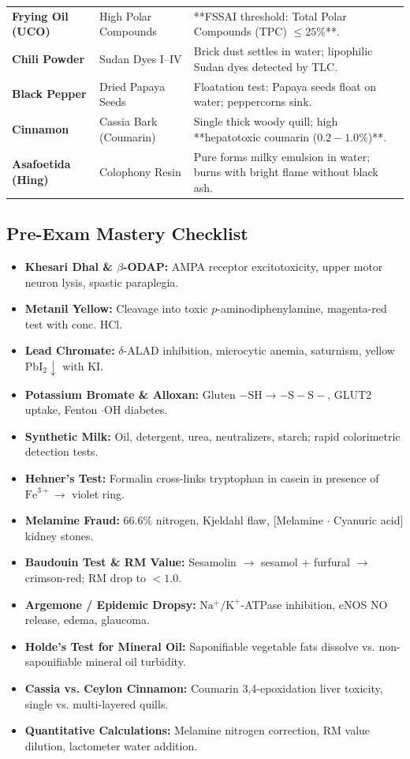 \documentclass[10pt,a4paper,oneside]{article}
\begin{document}
\begin{center}
\begin{tabular}{@{}p{3.2cm} p{3.8cm} p{10.0cm}@{}}
\textbf{Frying Oil (UCO)} & High Polar Compounds & **FSSAI threshold: Total Polar Compounds (TPC) $\le 25\%$**. \tabularnewline
\textbf{Chili Powder} & Sudan Dyes I--IV & Brick dust settles in water; lipophilic Sudan dyes detected by TLC. \tabularnewline
\textbf{Black Pepper} & Dried Papaya Seeds & Floatation test: Papaya seeds float on water; peppercorns sink. \tabularnewline
\textbf{Cinnamon} & Cassia Bark (Coumarin) & Single thick woody quill; high **hepatotoxic coumarin ($0.2-1.0\%$)**. \tabularnewline
\textbf{Asafoetida (Hing)} & Colophony Resin & Pure forms milky emulsion in water; burns with bright flame without black ash. \tabularnewline
\bottomrule
\end{tabular}
\end{center}

\subsection{Pre-Exam Mastery Checklist}
\begin{itemize}[leftmargin=*]
    \item[$\square$] \textbf{Khesari Dhal \& $\beta$-ODAP:} AMPA receptor excitotoxicity, upper motor neuron lysis, spastic paraplegia.
    \item[$\square$] \textbf{Metanil Yellow:} Cleavage into toxic $p$-aminodiphenylamine, magenta-red test with conc. $\mathrm{HCl}$.
    \item[$\square$] \textbf{Lead Chromate:} $\delta$-ALAD inhibition, microcytic anemia, saturnism, yellow $\mathrm{PbI_2}\downarrow$ with $\mathrm{KI}$.
    \item[$\square$] \textbf{Potassium Bromate \& Alloxan:} Gluten $-\mathrm{SH} \rightarrow -\mathrm{S-S-}$, GLUT2 uptake, Fenton $\mathrm{\cdot OH}$ diabetes.
    \item[$\square$] \textbf{Synthetic Milk:} Oil, detergent, urea, neutralizers, starch; rapid colorimetric detection tests.
    \item[$\square$] \textbf{Hehner's Test:} Formalin cross-links tryptophan in casein in presence of $\mathrm{Fe}^{3+} \rightarrow$ violet ring.
    \item[$\square$] \textbf{Melamine Fraud:} $66.6\%$ nitrogen, Kjeldahl flaw, [Melamine $\cdot$ Cyanuric acid] kidney stones.
    \item[$\square$] \textbf{Baudouin Test \& RM Value:} Sesamolin $\rightarrow$ sesamol + furfural $\rightarrow$ crimson-red; RM drop to $<1.0$.
    \item[$\square$] \textbf{Argemone / Epidemic Dropsy:} $\mathrm{Na^+/K^+}$-ATPase inhibition, eNOS $\mathrm{NO}$ release, edema, glaucoma.
    \item[$\square$] \textbf{Holde's Test for Mineral Oil:} Saponifiable vegetable fats dissolve vs. non-saponifiable mineral oil turbidity.
    \item[$\square$] \textbf{Cassia vs. Ceylon Cinnamon:} Coumarin 3,4-epoxidation liver toxicity, single vs. multi-layered quills.
    \item[$\square$] \textbf{Quantitative Calculations:} Melamine nitrogen correction, RM value dilution, lactometer water addition.
\end{itemize}
\end{document}
